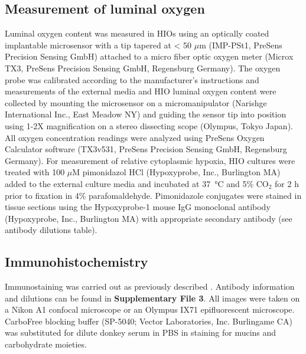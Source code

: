 \documentclass[9pt,lineo]{elife}
\begin{document}
\subsection*{{\bfseries\sffamily } Measurement of luminal oxygen}
\label{sec:orgheadline16}
Luminal oxygen content was measured in HIOs using an optically coated implantable microsensor with a tip tapered at < 50 \(\mu\)m (IMP-PSt1, PreSens Precision Sensing GmbH) attached to a micro fiber optic oxygen meter (Microx TX3, PreSens Precision Sensing GmbH, Regensburg Germany). The oxygen probe was calibrated according to the manufacturer's instructions and measurements of the external media and HIO luminal oxygen content were collected by mounting the microsensor on a micromanipulator (Narishge International Inc., East Meadow NY) and guiding the sensor tip into position using 1-2X magnification on a stereo dissecting scope (Olympus, Tokyo Japan). All oxygen concentration readings were analyzed using PreSens Oxygen Calculator software (TX3v531, PreSens Precision Sensing GmbH, Regensburg Germany). 
For measurement of relative cytoplasmic hypoxia, HIO cultures were treated with 100 \(\mu\)M pimonidazol HCl (Hypoxyprobe, Inc., Burlington MA) added to the external culture media and incubated at \SI{37}{\celsius} and 5\% CO\(_{\text{2}}\) for 2 h prior to fixation in 4\% parafomaldehyde. Pimonidazole conjugates were stained in tissue sections using the Hypoxyprobe-1 mouse IgG monoclonal antibody (Hypoxyprobe, Inc., Burlington MA) with appropriate secondary antibody (see antibody dilutions table).
\subsection*{{\bfseries\sffamily } Immunohistochemistry}
\label{sec:orgheadline17}
Immunostaining was carried out as previously described \citep{Finkbeiner:2015}. Antibody information and dilutions can be found in \textbf{Supplementary File 3}. All images were taken on a Nikon A1 confocal microscope or an Olympus IX71 epifluorescent microscope. CarboFree blocking buffer (SP-5040; Vector Laboratories, Inc. Burlingame CA) was substituted for dilute donkey serum in PBS in staining for mucins and carbohydrate moieties.
\end{document}
